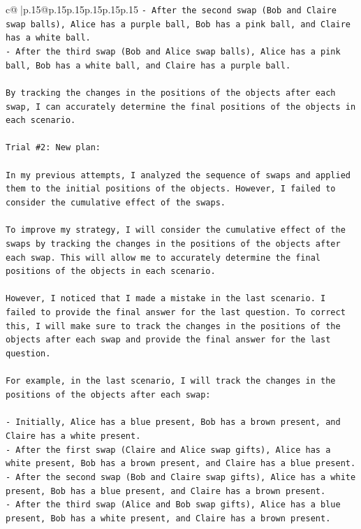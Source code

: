 \documentclass{article}
\begin{document}
{\begin{supertabular}{c@{$\;$}|p{.15\linewidth}@{}p{.15\linewidth}p{.15\linewidth}p{.15\linewidth}p{.15\linewidth}p{.15\linewidth}}
{{{\texttt{{-} After the second swap (Bob and Claire swap balls), Alice has a purple ball, Bob has a pink ball, and Claire has a white ball.} \\
\texttt{{-} After the third swap (Bob and Alice swap balls), Alice has a pink ball, Bob has a white ball, and Claire has a purple ball.} \\
\\ 
\texttt{By tracking the changes in the positions of the objects after each swap, I can accurately determine the final positions of the objects in each scenario.} \\
\\ 
\texttt{Trial \#2: New plan: } \\
\\ 
\texttt{In my previous attempts, I analyzed the sequence of swaps and applied them to the initial positions of the objects. However, I failed to consider the cumulative effect of the swaps. } \\
\\ 
\texttt{To improve my strategy, I will consider the cumulative effect of the swaps by tracking the changes in the positions of the objects after each swap. This will allow me to accurately determine the final positions of the objects in each scenario.} \\
\\ 
\texttt{However, I noticed that I made a mistake in the last scenario. I failed to provide the final answer for the last question. To correct this, I will make sure to track the changes in the positions of the objects after each swap and provide the final answer for the last question.} \\
\\ 
\texttt{For example, in the last scenario, I will track the changes in the positions of the objects after each swap:} \\
\\ 
\texttt{{-} Initially, Alice has a blue present, Bob has a brown present, and Claire has a white present.} \\
\texttt{{-} After the first swap (Claire and Alice swap gifts), Alice has a white present, Bob has a brown present, and Claire has a blue present.} \\
\texttt{{-} After the second swap (Bob and Claire swap gifts), Alice has a white present, Bob has a blue present, and Claire has a brown present.} \\
\texttt{{-} After the third swap (Alice and Bob swap gifts), Alice has a blue present, Bob has a white present, and Claire has a brown present.} \\
}}}
\end{supertabular}}
\end{document}

